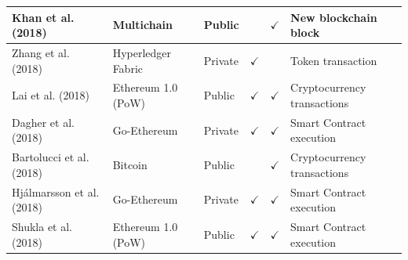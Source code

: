 \documentclass[../access.tex]{subfiles}
\begin{document}
\begin{table}[htbp]
\begin{adjustwidth}{-2cm}{}
\begin{tabular}{m{4.4cm} >{\centering\arraybackslash}m{2.9cm} >{\centering\arraybackslash}m{1.0cm} >{\centering\arraybackslash}m{1.0cm} >{\centering\arraybackslash}m{1.5cm} >{\centering\arraybackslash}m{3.6cm}}
            \hline
            \footnotesize{Khan et al. (2018) \cite{Khan2018}}                   & \footnotesize{Multichain}                      & \footnotesize{Public}                            & {}                                                     & $ \checkmark $                                        & \footnotesize{New blockchain block}        \\
            \hline
            \footnotesize{Zhang et al. (2018) \cite{Zhang2018}}                 & \footnotesize{Hyperledger Fabric}              & \footnotesize{Private}                           & $ \checkmark $                                         & {}                                                    & \footnotesize{Token transaction}           \\
            \hline
            \footnotesize{Lai et al. (2018) \cite{Lai2018}}                     & \footnotesize{Ethereum 1.0 (PoW)}              & \footnotesize{Public}                            & $ \checkmark $                                         & $ \checkmark $                                        & \footnotesize{Cryptocurrency transactions} \\
            \hline
            \footnotesize{Dagher et al. (2018) \cite{Dagher2018}}               & \footnotesize{Go-Ethereum}                     & \footnotesize{Private}                           & $ \checkmark $                                         & $ \checkmark $                                        & \footnotesize{Smart Contract execution}    \\
            \hline
            \footnotesize{Bartolucci et al. (2018) \cite{Bartolucci2018}}       & \footnotesize{Bitcoin}                         & \footnotesize{Public}                            & {}                                                     & $ \checkmark $                                        & \footnotesize{Cryptocurrency transactions} \\
            \hline
            \footnotesize{Hj\'{a}lmarsson et al. (2018) \cite{Hjalmarsson2018}} & \footnotesize{Go-Ethereum}                     & \footnotesize{Private}                           & $ \checkmark $                                         & $ \checkmark $                                        & \footnotesize{Smart Contract execution}    \\
            \hline
            \footnotesize{Shukla et al. (2018) \cite{Shukla2018}}               & \footnotesize{Ethereum 1.0 (PoW)}              & \footnotesize{Public}                            & $ \checkmark $                                         & $ \checkmark $                                        & \footnotesize{Smart Contract execution}    \\

\end{tabular}
\end{adjustwidth}
\end{table}
\end{document}
